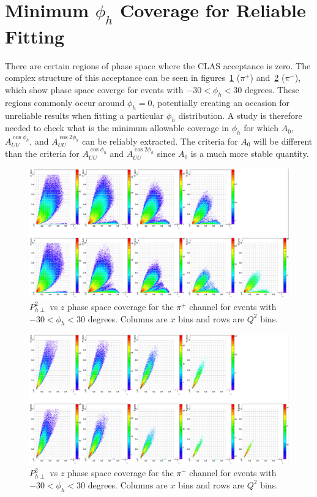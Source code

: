 \section{Minimum $\phi_h$ Coverage for Reliable Fitting}
\label{sec:minPhihCoverage}
There are certain regions of phase space where the CLAS acceptance is zero.
The complex structure of this acceptance can be seen in figures~\ref{fig:zPT2_wPhih_n30to30deg_pip} ($\pi^+$) and~\ref{fig:zPT2_wPhih_n30to30deg_pim} ($\pi^-$), which show phase space coverge for events with $-30 < \phi_h < 30$ degrees.
These regions commonly occur around $\phi_h = 0$, potentially creating an occasion for unreliable results when fitting a particular $\phi_h$ distribution.
A study is therefore needed to check what is the minimum allowable coverage in $\phi_h$ for which $A_0$, $A_{UU}^{\cos\phi_h}$, and $A_{UU}^{\cos 2\phi_h}$ can be reliably extracted.
The criteria for $A_0$ will be different than the criteria for $A_{UU}^{\cos\phi_h}$ and $A_{UU}^{\cos 2\phi_h}$ since $A_0$ is a much more stable quantity.
%
\begin{figure}
\centering
\includegraphics[width=8.5in]{figures/zPT2_wPhih_n30to30deg_pip.png}
\caption{$P_{h\perp}^2$ vs $z$ phase space coverage for the $\pi^+$ channel for events with $-30 < \phi_h < 30$ degrees. Columns are $x$ bins and rows are $Q^2$ bins.}
\label{fig:zPT2_wPhih_n30to30deg_pip}
\end{figure}
%
\begin{figure}
\centering
\includegraphics[width=8.5in]{figures/zPT2_wPhih_n30to30deg_pim.png}
\caption{$P_{h\perp}^2$ vs $z$ phase space coverage for the $\pi^-$ channel for events with $-30 < \phi_h < 30$ degrees. Columns are $x$ bins and rows are $Q^2$ bins.}
\label{fig:zPT2_wPhih_n30to30deg_pim}
\end{figure}
%

